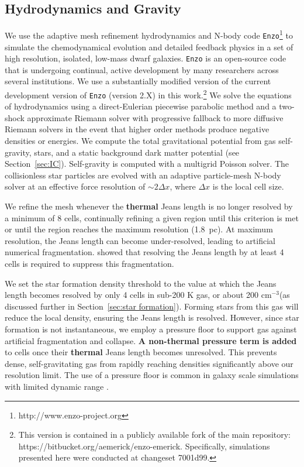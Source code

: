 \documentclass[fleqn,usenatbib,useAMS]{mnras}
\newcommand{\ccunit}{cm$^{-3}$}
\begin{document}
\subsection{Hydrodynamics and Gravity}
\label{sec:hydro}

We use the adaptive mesh refinement hydrodynamics and N-body code \texttt{Enzo}\footnote{http://www.enzo-project.org} to simulate the chemodynamical evolution and detailed feedback physics in a set of high resolution, isolated, low-mass dwarf galaxies. \texttt{Enzo} is an open-source code that is undergoing continual, active development by many researchers across several institutions. We use a substantially modified version of the current development version of \texttt{Enzo} (version 2.X) in this work.\footnote{This version is contained in a publicly available fork of the main repository: https://bitbucket.org/aemerick/enzo-emerick. Specifically, simulations presented here were conducted at changeset 7001d99.} We solve the equations of hydrodynamics using a direct-Eulerian piecewise parabolic method \citep{ColellaWoodward1984, Bryan1995} and a two-shock approximate Riemann solver with progressive fallback to more diffusive Riemann solvers in the event that higher order methods produce negative densities or energies. We compute the total gravitational potential from gas self-gravity, stars, and a static background dark matter potential (see Section~\ref{sec:IC}). Self-gravity is computed with a multigrid Poisson solver. The collisionless star particles are evolved with an adaptive particle-mesh N-body solver at an effective force resolution of $\sim 2 \Delta x$, where $\Delta x$ is the local cell size. 

We refine the mesh whenever the \textbf{thermal} Jeans length is no longer resolved by a minimum of 8 cells, continually refining a given region until this criterion is met or until the region reaches the maximum resolution (1.8~pc). At maximum resolution, the Jeans length can become under-resolved, leading to artificial numerical fragmentation. \citet{Truelove1997} showed that resolving the Jeans length by at least 4 cells is required to suppress this fragmentation.

We set the star formation density threshold to the value at which the Jeans length becomes resolved by only 4 cells in sub-200 K gas, or about 200 \ccunit (as discussed further in Section~\ref{sec:star formation}). Forming stars from this gas will reduce the local density, ensuring the Jeans length is resolved. However, since star formation is not instantaneous, we employ a pressure floor to support gas against artificial fragmentation and collapse. \textbf{A non-thermal pressure term is added} to cells once their \textbf{thermal} Jeans length becomes unresolved. This prevents dense, self-gravitating gas from rapidly reaching densities significantly above our resolution limit. The use of a pressure floor is common in galaxy scale simulations with limited dynamic range \citep[e.g][]{Machacek2001, 2008ApJ...680.1083R}.
\end{document}
